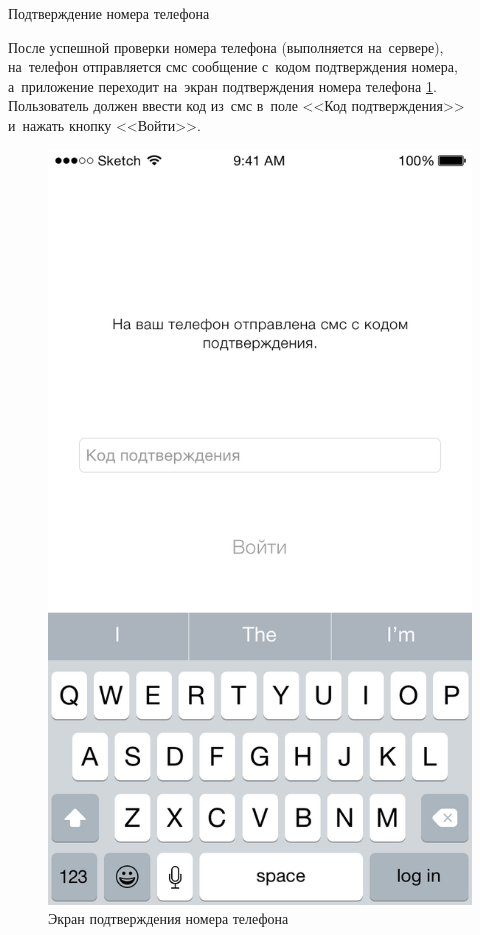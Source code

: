 \subsubsection{} Подтверждение номера телефона
\label{sec:usage:auth:sms}

После успешной проверки номера телефона (выполняется на~сервере), на~телефон отправляется смс сообщение с~кодом подтверждения номера, а~приложение переходит на~экран подтверждения номера телефона \ref{sec:usage:auth:sms:confirm}. Пользователь должен ввести код из~смс в~поле <<Код подтверждения>> и~нажать кнопку <<Войти>>.

\begin{figure}[h]
  \centering
    \includegraphics[height=0.25\textheight]{inc/img/ui/sms_not_entered.png}
  \caption{Экран подтверждения номера телефона}
  \label{sec:usage:auth:sms:confirm}
\end{figure}